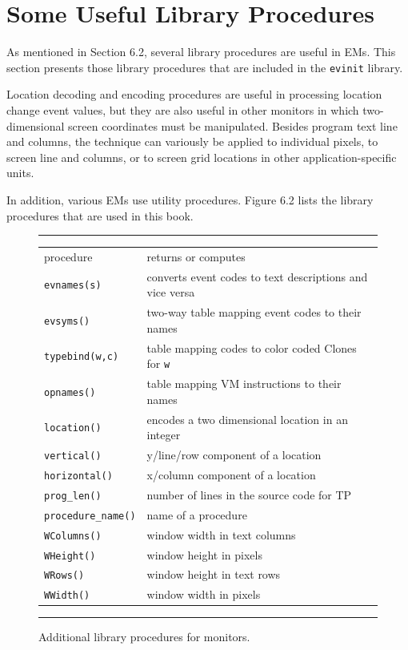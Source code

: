 \section{Some Useful Library Procedures}

As mentioned in Section 6.2, several library procedures are useful
in EMs.  This section presents those library procedures that are
included in the {\tt evinit\/} library.

Location decoding and encoding procedures are useful in processing 
location change event values, but they are also useful in other monitors
in which two-dimensional screen coordinates must be manipulated.
Besides program text line and columns, the technique can variously be
applied to individual pixels, to screen line and columns, or to screen
grid locations in other application-specific units.

In addition, various EMs use utility procedures.  Figure 6.2 lists the
library procedures that are used in this book.

\begin{figure}[t]
\hrule\bigskip
\centering

\begin{tabular}{|ll|} \hline
procedure  & returns or computes \\
{\tt evnames(s)} & converts event codes to text descriptions and vice versa\\
{\tt evsyms()} & two-way table mapping event codes to their names \\
{\tt typebind(w,c)} & table mapping codes to color coded Clones for {\tt w}\\
{\tt opnames()} & table mapping VM instructions to their names \\
{\tt location()} & encodes a two dimensional location in an integer \\
{\tt vertical()} & y/line/row component of a location \\
{\tt horizontal()} & x/column component of a location \\
{\tt prog\_len()} & number of lines in the source code for TP \\
{\tt procedure\_name()} & name of a procedure \\
{\tt WColumns()} & window width in text columns \\
{\tt WHeight()} & window height in pixels \\
{\tt WRows()} & window height in text rows \\
{\tt WWidth()} & window width in pixels \\
\hline
\end{tabular}

\caption{Additional library procedures for monitors.}
\medskip\hrule
\end{figure}


